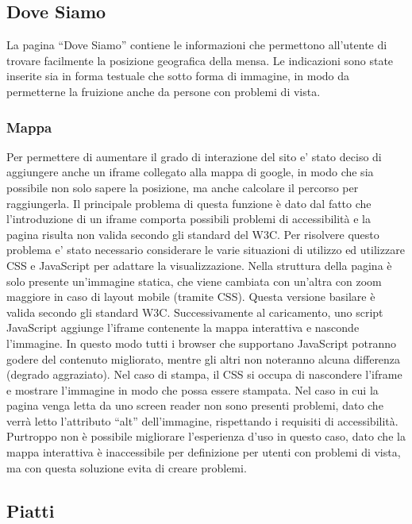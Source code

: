 \documentclass[10pt,a4paper,onecolumn]{article}
\begin{document}
\subsection{Dove Siamo}

La pagina ``Dove Siamo'' contiene le informazioni che permettono all’utente di trovare facilmente la posizione geografica della mensa. Le indicazioni sono state inserite sia in forma testuale che sotto forma di immagine, in modo da permetterne la fruizione anche da persone con problemi di vista.

\subsubsection{Mappa}

Per permettere di aumentare il grado di interazione del sito e’ stato deciso di aggiungere anche un iframe collegato alla mappa di google, in modo che sia possibile non solo sapere la posizione, ma anche calcolare il percorso per raggiungerla.
Il principale problema di questa funzione è dato dal fatto che l’introduzione di un iframe comporta possibili problemi di accessibilità e la pagina risulta non valida secondo gli standard del W3C.
Per risolvere questo problema e’ stato necessario considerare le varie situazioni di utilizzo ed utilizzare CSS e JavaScript per adattare la visualizzazione.
Nella struttura della pagina è solo presente un’immagine statica, che viene cambiata con un’altra con zoom maggiore in caso di layout mobile (tramite CSS). Questa versione basilare è valida secondo gli standard W3C. Successivamente al caricamento, uno script JavaScript aggiunge l’iframe contenente la mappa interattiva e nasconde l’immagine. In questo modo tutti i browser che supportano JavaScript potranno godere del contenuto migliorato, mentre gli altri non noteranno alcuna differenza (degrado aggraziato). Nel caso di stampa, il CSS si occupa di nascondere l’iframe e mostrare l’immagine in modo che possa essere stampata.
Nel caso in cui la pagina venga letta da uno screen reader non sono presenti problemi, dato che verrà letto l’attributo ``alt'' dell’immagine, rispettando i requisiti di accessibilità. Purtroppo non è possibile migliorare l’esperienza d’uso in questo caso, dato che la mappa interattiva è inaccessibile per definizione per utenti con problemi di vista, ma con questa soluzione evita di creare problemi.

\subsection{Piatti}
\end{document}
